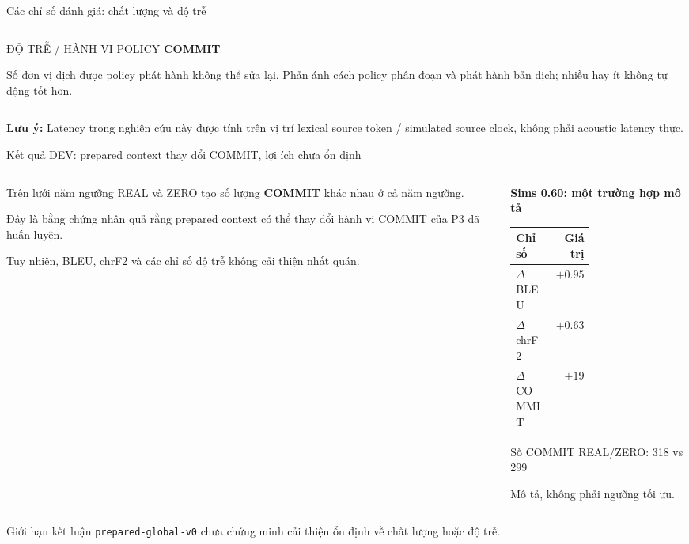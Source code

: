 \documentclass[aspectratio=169,11pt]{beamer}
\begin{document}
\begin{frame}{Các chỉ số đánh giá: chất lượng và độ trễ}
\begin{columns}[T,onlytextwidth]
\begin{column}{0.485\textwidth}
\begin{block}{ĐỘ TRỄ / HÀNH VI POLICY}
        \vspace{0.35em}
        \textbf{\normalsize COMMIT}\par
        \vspace{0.1em}
        Số đơn vị dịch được policy phát hành không thể sửa lại. Phản ánh cách policy phân đoạn và phát hành bản dịch; nhiều hay ít không tự động tốt hơn.
      \end{block}
    \end{column}
  \end{columns}
  \vfill
  \centering\scriptsize\color{TimelyGray}
  \textbf{Lưu ý:} Latency trong nghiên cứu này được tính trên vị trí lexical source token / simulated source clock, không phải acoustic latency thực.
\end{frame}

\begin{frame}{Kết quả DEV: prepared context thay đổi COMMIT, lợi ích chưa ổn định}
  \begin{columns}[T,onlytextwidth]
    \begin{column}{0.47\textwidth}
      \begin{block}{Trên lưới năm ngưỡng}
        REAL và ZERO tạo số lượng \textbf{COMMIT} khác nhau ở cả năm ngưỡng.
      \end{block}
      \small
      Đây là bằng chứng nhân quả rằng prepared context có thể thay đổi hành vi COMMIT của P3 đã huấn luyện.
      \vspace{0.35em}

      Tuy nhiên, BLEU, chrF2 và các chỉ số độ trễ không cải thiện nhất quán.
    \end{column}
    \begin{column}{0.49\textwidth}
      \centering
      \textbf{Sims 0.60: một trường hợp mô tả}

      \vspace{0.35em}
      \begin{tabular}{>{\raggedright\arraybackslash}p{0.45\linewidth}r}
        \toprule
        Chỉ số & Giá trị \\
        \midrule
        $\Delta$ BLEU & $+0.95$ \\
        $\Delta$ chrF2 & $+0.63$ \\
        $\Delta$ COMMIT & $+19$ \\
        \bottomrule
      \end{tabular}

      \vspace{0.25em}
      \scriptsize Số COMMIT REAL/ZERO: 318 vs 299\par
      \alert{Mô tả, không phải ngưỡng tối ưu.}
    \end{column}
  \end{columns}
  \vfill
  \begin{alertblock}{Giới hạn kết luận}
    \texttt{prepared-global-v0} chưa chứng minh cải thiện ổn định về chất lượng hoặc độ trễ.
  \end{alertblock}
\end{frame}
\end{document}
